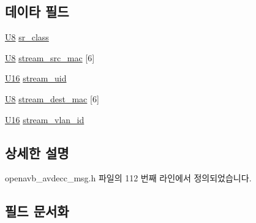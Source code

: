 \subsection*{데이타 필드}
\begin{DoxyCompactItemize}
\item 
\hyperlink{openavb__types__base__pub_8h_aa63ef7b996d5487ce35a5a66601f3e73}{U8} \hyperlink{structopenavb_avdecc_msg_params___c2_s___talker_stream_i_d__t_a39d4e73b306d801de38536c43ef7a5e8}{sr\+\_\+class}
\item 
\hyperlink{openavb__types__base__pub_8h_aa63ef7b996d5487ce35a5a66601f3e73}{U8} \hyperlink{structopenavb_avdecc_msg_params___c2_s___talker_stream_i_d__t_ab9d3cf41d938e8795e395632cea06e77}{stream\+\_\+src\+\_\+mac} \mbox{[}6\mbox{]}
\item 
\hyperlink{openavb__types__base__pub_8h_a0a0a322d5fa4a546d293a77ba8b4a71f}{U16} \hyperlink{structopenavb_avdecc_msg_params___c2_s___talker_stream_i_d__t_a511b2a26fe61b945ced1dd0bab9f2d1b}{stream\+\_\+uid}
\item 
\hyperlink{openavb__types__base__pub_8h_aa63ef7b996d5487ce35a5a66601f3e73}{U8} \hyperlink{structopenavb_avdecc_msg_params___c2_s___talker_stream_i_d__t_a26087f365a751a1415364bfb5e2b8a0e}{stream\+\_\+dest\+\_\+mac} \mbox{[}6\mbox{]}
\item 
\hyperlink{openavb__types__base__pub_8h_a0a0a322d5fa4a546d293a77ba8b4a71f}{U16} \hyperlink{structopenavb_avdecc_msg_params___c2_s___talker_stream_i_d__t_a31db70d552fc6f5d35875430fca593e6}{stream\+\_\+vlan\+\_\+id}
\end{DoxyCompactItemize}


\subsection{상세한 설명}


openavb\+\_\+avdecc\+\_\+msg.\+h 파일의 112 번째 라인에서 정의되었습니다.



\subsection{필드 문서화}
